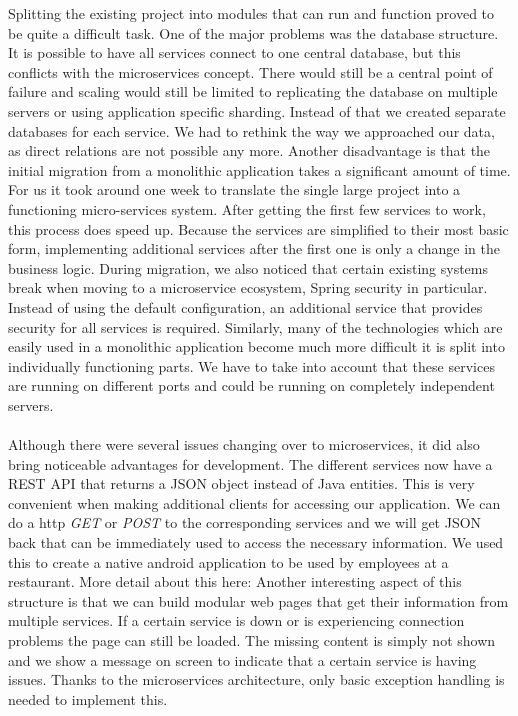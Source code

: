 \documentclass[12pt]{article}
\begin{document}
\begin{multicols}{2}
\noindent Splitting the existing project into modules that can run and function proved to be quite a difficult task. One of the major problems was the database structure. It is possible to have all services connect to one central database, but this conflicts with the microservices concept. There would still be a central point of failure and scaling would still be limited to replicating the database on multiple servers or using application specific sharding. Instead of that we created separate databases for each service. We had to rethink the way we approached our data, as direct relations are not possible any more. Another disadvantage is that the initial migration from a monolithic application takes a significant amount of time. For us it took around one week to translate the single large project into a functioning micro-services system. After getting the first few services to work, this process does speed up. Because the services are simplified to their most basic form, implementing additional services after the first one is only a change in the business logic. During migration, we also noticed that certain existing systems break when moving to a microservice ecosystem, Spring security in particular. Instead of using the default configuration, an additional service that provides security for all services is required. Similarly, many of the technologies which are easily used in a monolithic application become much more difficult it is split into individually functioning parts. We have to take into account that these services are running on different ports and could be running on completely independent servers.
\\\\
Although there were several issues changing over to microservices, it did also bring noticeable advantages for development. The different services now have a REST API that returns a JSON object instead of Java entities. This is very convenient when making additional clients for accessing our application. We can do a http \textit{GET} or \textit{POST} to the corresponding services and we will get JSON back that can be immediately used to access the necessary information. We used this to create a native android application to be used by employees at a restaurant. More detail about this here: %
Another interesting aspect of this structure is that we can build modular web pages that get their information from multiple services. If a certain service is down or is experiencing connection problems the page can still be loaded. The missing content is simply not shown and we show a message on screen to indicate that a certain service is having issues. Thanks to the microservices architecture, only basic exception handling is needed to implement this.

\end{multicols}
\end{document}
